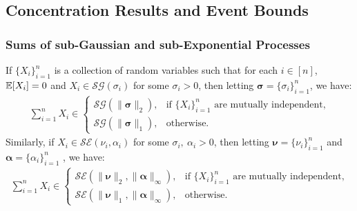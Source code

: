 \subsection{Concentration Results and Event Bounds}
\label{app:concentration}

\subsubsection{Sums of sub-Gaussian and sub-Exponential Processes}

\begin{lemma}\label{lemma:sum-sub-gaussian}
If $\{X_i\}_{i=1}^n$ is a collection of random variables such that for each $i \in [n]$, $\mathbb{E}[X_i] = 0$ and $X_i \in \mathcal{SG}(\sigma_i)$ for some $\sigma_i > 0$, then letting $\boldsymbol{\sigma} = \{\sigma_i\}_{i=1}^n$, we have:
\begin{align*}
    \sum_{i=1}^n X_i \in 
    \begin{cases}
        \mathcal{SG}(\lVert \boldsymbol{\sigma}\rVert_2), &\text{if $\{X_i\}_{i=1}^n$ are mutually independent,} \\
        \mathcal{SG}(\lVert \boldsymbol{\sigma}\rVert_1), &\text{otherwise.}
    \end{cases}
\end{align*}
Similarly, if $X_i \in \mathcal{SE}(\nu_i, \alpha_i)$ for some $\sigma_i,\:\alpha_i > 0$, then letting $\boldsymbol{\nu} = \{\nu_i\}_{i=1}^n$ and $\boldsymbol{\alpha} = \{\alpha_i\}_{i=1}^n$ , we have:
\begin{align*}
    \sum_{i=1}^n X_i \in 
    \begin{cases}
        \mathcal{SE}(\lVert \boldsymbol{\nu}\rVert_2, \lVert \boldsymbol{\alpha}\rVert_\infty), &\text{if $\{X_i\}_{i=1}^n$ are mutually independent,} \\
        \mathcal{SE}(\lVert \boldsymbol{\nu}\rVert_1,  \lVert \boldsymbol{\alpha}\rVert_\infty), &\text{otherwise.}
    \end{cases}
\end{align*}
\end{lemma}


